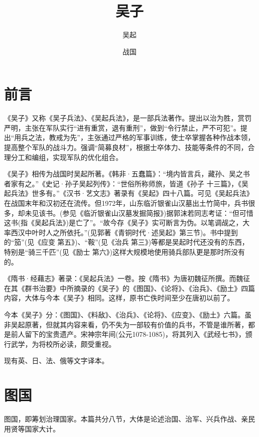 \documentclass[a4paper,12pt,UTF8,twoside]{ctexbook}
\title{\heiti\zihao{0} 吴子}
\author{吴起}
\date{战国}
\begin{document}
\maketitle
\tableofcontents

\frontmatter
\chapter{前言}

《吴子》又称《吴子兵法》、《吴起兵法》，是一部兵法著作。提出以治为胜，赏罚严明，主张在军队实行“进有重赏，退有重刑”，做到“令行禁止，严不可犯”。提出“用兵之法，教戒为先”，主张通过严格的军事训练，使士卒掌握各种作战本领，提高整个军队的战斗力。强调“简募良材”，根据士卒体力、技能等条件的不同，合理分工和编组，实现军队的优化组合。

《吴子》相传为战国时吴起所著。《韩非·五蠢篇》：“境内皆言兵，藏孙、吴之书者家有之。”《史记·孙子吴起列传》：“世俗所称师旅，皆道《孙子 十三篇》，《吴起兵法》世多有。”《汉书·艺文志》著录有《吴起》四十八篇。可见《吴起兵法》在战国末年和汉初还在流传。但1972年，山东临沂银雀山汉墓出土竹简中，兵书很多，却未见该书。(参见《临沂银雀山汉墓发掘简报》)据郭沫若同志考证：“但可惜这书(指《吴起兵法》)是亡了”。“故今存《吴子》实可断言为伪。以笔调觇之，大率西汉中叶时人之所依托。”(见郭著《青铜时代·述吴起》第三节)。书中提到的“笳”(见《应变 第五》)、“鞍”(见《治兵 第三》)等都是吴起时代还没有的东西，特别是“骑三千匹”(见《励士 第六》)这样大规模地使用骑兵部队更是那时所没有的。

《隋书·经藉志》著录：《吴起兵法》一卷。按《隋书》为唐初魏征所撰。而魏征在其《群书治要》中所摘录的《吴子》的《图国》、《论将》、《治兵》、《励土》四篇内容，大体与今本《吴子》相同。这样，原书亡佚时间至少在唐初以前了。

今本《吴子》分：《图国》、《料敌》、《治兵》、《论将》、《应变》、《励土》六篇。虽非吴起原著，但就其内容来看，仍不失为一部较有价值的兵书，不管是谁所著，都是前人留下的宝贵遗产。宋神宗年间(公元1078-1085)，将其列入《武经七书》，颁行武学，为将校所必读，颇受重视。

现有英、日、法、俄等文字译本。

\mainmatter

\chapter{图国}

图国，即筹划治理国家。本篇共分八节，大体是论述治国、治军、兴兵作战、亲民用贤等国家大计。
\end{document}
